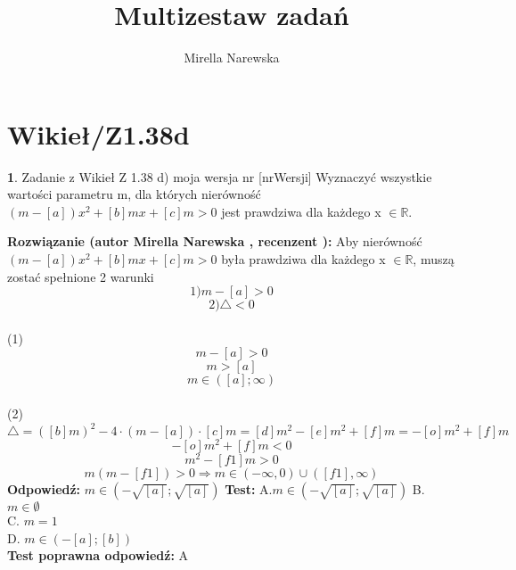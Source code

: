 \documentclass[12pt, a4paper]{article}
\title{Multizestaw zadań}
\author{Mirella Narewska}
\date{}
\theoremstyle{definition} %
\newtheorem{zad}{}
\newcommand{\kategoria}[1]{\section{#1}} %
\newcommand{\zadStart}[1]{\begin{zad}#1\newline} %
\newcommand{\zadStop}{\end{zad}}   %
\newcommand{\rozwStart}[2]{\noindent \textbf{Rozwiązanie (autor #1 , recenzent #2): }\newline} %
\newcommand{\odpStart}{\noindent \textbf{Odpowiedź:}\newline}    %
\newcommand{\odpStop}{\newline}                                             %
\newcommand{\testStart}{\noindent \textbf{Test:}\newline} %
\newcommand{\testStop}{\newline} %
\newcommand{\kluczStart}{\noindent \textbf{Test poprawna odpowiedź:}\newline} %
\newcommand{\kluczStop}{\newline} %
\begin{document}
\maketitle


\kategoria{Wikieł/Z1.38d}
\zadStart{Zadanie z Wikieł Z 1.38 d) moja wersja nr [nrWersji]}
Wyznaczyć wszystkie wartości parametru m, dla których nierówność $(m-[a])x^2+[b]mx+[c]m>0$ jest prawdziwa dla każdego x $\in \mathbb{R}.$
\zadStop
\rozwStart{Mirella Narewska}{}
Aby nierówność $(m-[a])x^2+[b]mx+[c]m>0$ była prawdziwa dla każdego  x $\in \mathbb{R}$, muszą zostać spełnione 2 warunki
$$1) m-[a]>0$$
$$2)  \triangle<0$$
\\
(1)
\\
$$m-[a]>0$$
$$m>[a]$$
$$m \in ([a];\infty)$$
\\
(2)
\\
$$\triangle=([b]m)^2-4\cdot(m-[a])\cdot[c]m=[d]m^2-[e]m^2+[f]m=-[o]m^2+[f]m$$
$$-[o]m^2+[f]m<0$$
$$m^2-[f1]m>0$$
$$m(m-[f1])>0 \Rightarrow m \in (-\infty,0) \cup ([f1],\infty)$$
\odpStart
$m \in (-\sqrt{[a]};\sqrt{[a]})$
\odpStop
\testStart
A.$m \in (-\sqrt{[a]};\sqrt{[a]})$
B. $m \in \emptyset$ \\
C. $m=1$ \\
D. $m \in (-[a];[b])$ \\
\testStop
\kluczStart
A
\kluczStop
\end{document}
